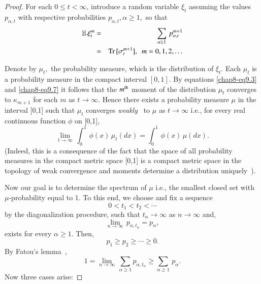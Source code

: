 \begin{proof}
For each $0\leq t<\infty$, introduce a random variable $\xi_t$ assuming the values $p_{\alpha, t}$ with respective probabilities $p_{\alpha, t}, \alpha\geq 1,$ so that 
\begin{eqnarray}
	\mathbb{E}\, \xi_t^m &=& \sum_{\alpha\geq 1}\, p_{\alpha, t}^{m+1} \notag \\
	&=& {\rm Tr}\,[\sigma_t^{m+1}],\ \ m=0,1,2,\ldots \label{chap8-eq9.7}
\end{eqnarray}

Denote by $\mu_t,$ the probability measure, which is the distribution of  $\xi_t$. Each $\mu_t$  is a probability measure in the compact interval $[0,1]$. By equations \eqref{chap8-eq9.3} and \eqref{chap8-eq9.7} it follows that the $m^{\rm th}$ moment of the distribution $\mu_t$ converges to $\kappa_{m+1}$ for each $m$ as $t\rightarrow\infty$. Hence there exists a probability measure $\mu$ in the interval [0,1] such that $\mu_t$ converges {\em weakly}~\cite{chap8-key41} to $\mu$ as $t\rightarrow \infty$ i.e., for every real continuous function $\phi$ on [0,1],  
\begin{equation}
	\underset{t\rightarrow\infty}{\lim}\, \int_0^1\, \phi(x)\, \mu_t(dx) =\int_0^1\, \phi(x)\, \mu(dx). \label{chap8-eq9.8}
\end{equation}
(Indeed, this is a consequence of the fact that the space of all probability measures in the compact metric space [0,1] is a compact metric space in the topology of weak convergence and moments determine a distribution uniquely~\cite{chap8-key41, chap8-key42}).

Now our goal is to determine the spectrum of $\mu$ i.e., the smallest closed set with $\mu$-probability equal to 1. To this end, we choose and fix a sequence 
\begin{equation}
	0< t_1< t_2<\cdots  \label{chap8-eq9.9}
\end{equation}
by the diagonalization procedure, such that $t_n\rightarrow \infty$ as $n\rightarrow \infty$ and, 
\begin{equation}
	\underset{n\rightarrow\infty}{\lim}\, p_{\alpha,t_n}=p_\alpha, \label{chap8-eq9.10}
\end{equation}
exists for every $\alpha\geq 1$. Then, 
\begin{equation}
	p_1\geq p_2\geq \cdots \geq 0.\label{chap8-eq9.11}
\end{equation}
By Fatou's lemma~\cite{chap8-key42}, 
\begin{equation}
	1=\underset{n\rightarrow\infty}{\lim}\,\sum_{\alpha\geq 1} p_{\alpha, t_n} \geq \sum_{\alpha\geq 1}\, p_\alpha. \label{chap8-eq9.12}
\end{equation}
Now three cases arise: 
\smallskip


\end{proof}
